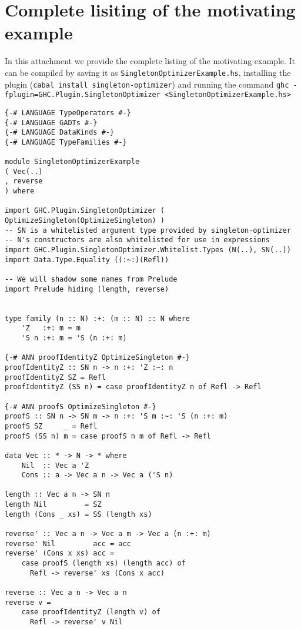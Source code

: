 \chapter{Complete lisiting of the motivating example}
\label{cha:example}

In this attachment we provide the complete listing of the motivating example.
It can be compiled by saving it as \texttt{SingletonOptimizerExample.hs}, installing the plugin (\texttt{cabal install singleton-optimizer}) and running the command \texttt{ghc -fplugin=GHC.Plugin.SingletonOptimizer <SingletonOptimizerExample.hs>}

\begin{lstlisting}[caption=Optimizing a length-indexed vector reversal with the \texttt{singleton-optimizer} GHC plugin.]
{-# LANGUAGE TypeOperators #-}
{-# LANGUAGE GADTs #-}
{-# LANGUAGE DataKinds #-}
{-# LANGUAGE TypeFamilies #-}

module SingletonOptimizerExample
( Vec(..)
, reverse
) where

import GHC.Plugin.SingletonOptimizer ( OptimizeSingleton(OptimizeSingleton) )
-- SN is a whitelisted argument type provided by singleton-optimizer
-- N's constructors are also whitelisted for use in expressions
import GHC.Plugin.SingletonOptimizer.Whitelist.Types (N(..), SN(..))
import Data.Type.Equality ((:~:)(Refl))

-- We will shadow some names from Prelude
import Prelude hiding (length, reverse)


type family (n :: N) :+: (m :: N) :: N where
    'Z   :+: m = m
    'S n :+: m = 'S (n :+: m)

{-# ANN proofIdentityZ OptimizeSingleton #-}
proofIdentityZ :: SN n -> n :+: 'Z :~: n
proofIdentityZ SZ = Refl
proofIdentityZ (SS n) = case proofIdentityZ n of Refl -> Refl

{-# ANN proofS OptimizeSingleton #-}
proofS :: SN n -> SN m -> n :+: 'S m :~: 'S (n :+: m)
proofS SZ     _ = Refl
proofS (SS n) m = case proofS n m of Refl -> Refl

data Vec :: * -> N -> * where
    Nil  :: Vec a 'Z
    Cons :: a -> Vec a n -> Vec a ('S n)

length :: Vec a n -> SN n
length Nil         = SZ
length (Cons _ xs) = SS (length xs)

reverse' :: Vec a n -> Vec a m -> Vec a (n :+: m)
reverse' Nil         acc = acc
reverse' (Cons x xs) acc =
    case proofS (length xs) (length acc) of
      Refl -> reverse' xs (Cons x acc)

reverse :: Vec a n -> Vec a n
reverse v =
    case proofIdentityZ (length v) of
      Refl -> reverse' v Nil
\end{lstlisting}

